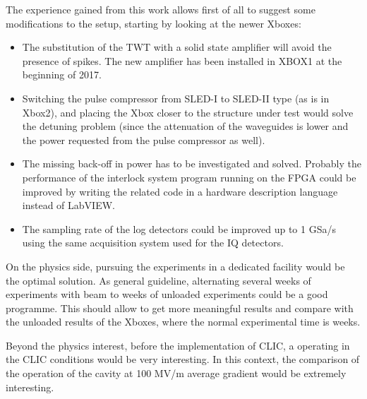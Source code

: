 The experience gained from this work allows first of all to suggest some modifications to the setup, starting by looking at the newer Xboxes:
\begin{itemize}
\item The substitution of the TWT with a solid state amplifier will avoid the presence of spikes. The new amplifier has been installed in XBOX1 at the beginning of 2017.
\item Switching the pulse compressor from SLED-I to SLED-II type (as is in Xbox2), and placing the Xbox closer to the structure under test would solve the detuning problem (since the attenuation of the waveguides is lower and the power requested from the pulse compressor as well).
\item The missing back-off in power has to be investigated and solved. Probably the performance of the interlock system program running on the FPGA could be improved by writing the related code in a hardware description language instead of LabVIEW.
\item The sampling rate of the log detectors could be improved up to 1 GSa/s using the same acquisition system used for the IQ detectors.
\end{itemize}

On the physics side, pursuing the experiments in a dedicated facility would be the optimal solution. As general guideline, alternating several weeks of experiments with beam to weeks of unloaded experiments could be a good programme. This should allow to get more meaningful results and compare with the unloaded results of the Xboxes, where the normal experimental time is weeks.

Beyond the physics interest, before the implementation of CLIC, a operating in the CLIC conditions would be very interesting. In this context, the comparison of the operation of the cavity at 100 MV/m average gradient would be extremely interesting.
